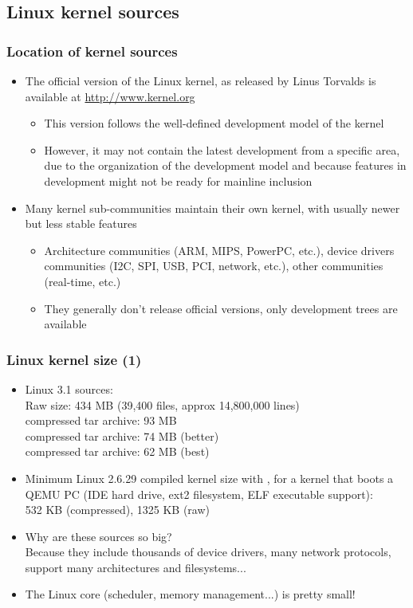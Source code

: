 \subsection{Linux kernel sources}

\begin{frame}
  \frametitle{Location of kernel sources}
  \begin{itemize}
  \item The official version of the Linux kernel, as released by Linus
    Torvalds is available at \url{http://www.kernel.org}
    \begin{itemize}
    \item This version follows the well-defined development model of
      the kernel
    \item However, it may not contain the latest development from a
      specific area, due to the organization of the development model
      and because features in development might not be ready for
      mainline inclusion
    \end{itemize}
  \item Many kernel sub-communities maintain their own kernel, with
    usually newer but less stable features
    \begin{itemize}
    \item Architecture communities (ARM, MIPS, PowerPC, etc.), device
      drivers communities (I2C, SPI, USB, PCI, network, etc.), other
      communities (real-time, etc.)
    \item They generally don't release official versions, only
      development trees are available
    \end{itemize}
  \end{itemize}
\end{frame}

\begin{frame}
  \frametitle{Linux kernel size (1)}
  \begin{itemize}
  \item Linux 3.1 sources:\\
    Raw size: 434 MB (39,400 files, approx 14,800,000 lines)\\
     compressed tar archive: 93 MB\\
     compressed tar archive: 74 MB (better)\\
     compressed tar archive: 62 MB (best)
  \item Minimum Linux 2.6.29 compiled kernel size with
    , for a kernel that boots a QEMU PC (IDE
    hard drive, ext2 filesystem, ELF executable support):\\
    532 KB (compressed), 1325 KB (raw)
  \item Why are these sources so big?\\
    Because they include thousands of device drivers, many network
    protocols, support many architectures and filesystems...
  \item The Linux core (scheduler, memory management...) is pretty
    small!
  \end{itemize}
\end{frame}

